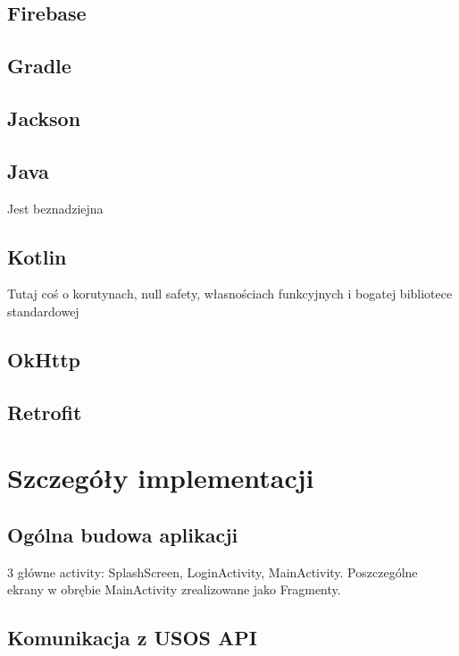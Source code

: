 \documentclass{pracamgr}
\begin{document}
\section{Firebase}

\section{Gradle}

\section{Jackson}

\section{Java}

Jest beznadziejna

\section{Kotlin}

Tutaj coś o korutynach, null safety, własnościach funkcyjnych i bogatej bibliotece standardowej

\section{OkHttp}

\section{Retrofit}

\chapter{Szczegóły implementacji}

\section{Ogólna budowa aplikacji}

3 główne activity: SplashScreen, LoginActivity, MainActivity.
Poszczególne ekrany w obrębie MainActivity zrealizowane jako
Fragmenty.

\section{Komunikacja z USOS API}
\end{document}
